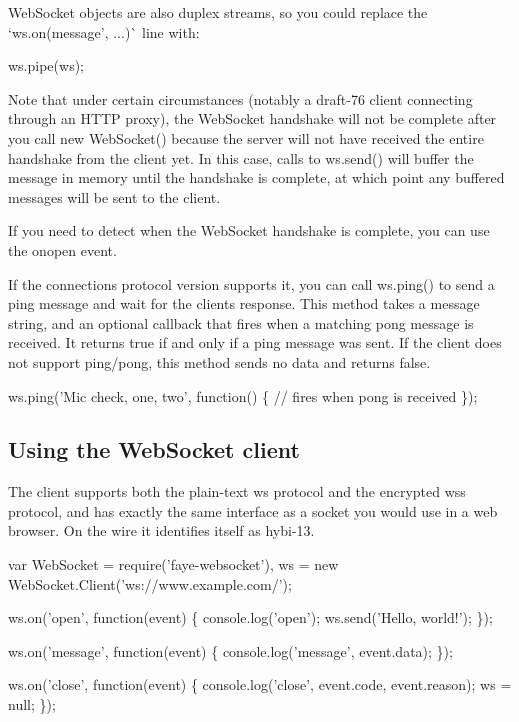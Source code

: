 {\ttfamily Web\+Socket} objects are also duplex streams, so you could replace the `ws.\+on(\textquotesingle{}message', ...)\`{} line with\+:


\begin{DoxyCode}
ws.pipe(ws);
\end{DoxyCode}


Note that under certain circumstances (notably a draft-\/76 client connecting through an H\+T\+TP proxy), the Web\+Socket handshake will not be complete after you call {\ttfamily new Web\+Socket()} because the server will not have received the entire handshake from the client yet. In this case, calls to {\ttfamily ws.\+send()} will buffer the message in memory until the handshake is complete, at which point any buffered messages will be sent to the client.

If you need to detect when the Web\+Socket handshake is complete, you can use the {\ttfamily onopen} event.

If the connection\textquotesingle{}s protocol version supports it, you can call {\ttfamily ws.\+ping()} to send a ping message and wait for the client\textquotesingle{}s response. This method takes a message string, and an optional callback that fires when a matching pong message is received. It returns {\ttfamily true} if and only if a ping message was sent. If the client does not support ping/pong, this method sends no data and returns {\ttfamily false}.


\begin{DoxyCode}
ws.ping('Mic check, one, two', function() \{
  // fires when pong is received
\});
\end{DoxyCode}


\subsection*{Using the Web\+Socket client}

The client supports both the plain-\/text {\ttfamily ws} protocol and the encrypted {\ttfamily wss} protocol, and has exactly the same interface as a socket you would use in a web browser. On the wire it identifies itself as {\ttfamily hybi-\/13}.


\begin{DoxyCode}
var WebSocket = require('faye-websocket'),
    ws        = new WebSocket.Client('ws://www.example.com/');

ws.on('open', function(event) \{
  console.log('open');
  ws.send('Hello, world!');
\});

ws.on('message', function(event) \{
  console.log('message', event.data);
\});

ws.on('close', function(event) \{
  console.log('close', event.code, event.reason);
  ws = null;
\});
\end{DoxyCode}


